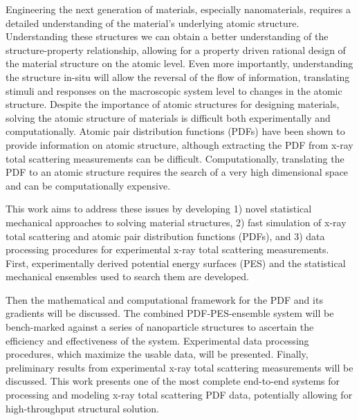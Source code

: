 Engineering the next generation of materials, especially nanomaterials, requires a detailed understanding of the material's underlying atomic structure.
 Understanding these structures we can obtain a better understanding of the structure-property relationship, allowing for a property driven rational design of the material structure on the atomic level.
 Even more importantly, understanding the structure in-situ will allow the reversal of the flow of information, translating stimuli and responses on the macroscopic system level to changes in the atomic structure.
 Despite the importance of atomic structures for designing materials, solving the atomic structure of materials is difficult both experimentally and computationally.
 Atomic pair distribution functions (PDFs) have been shown to provide information on atomic structure, although extracting the PDF from x-ray total scattering measurements can be difficult.
 Computationally, translating the PDF to an atomic structure requires the search of a very high dimensional space and can be computationally expensive.

This work aims to address these issues by developing 1) novel statistical mechanical approaches to solving material structures, 2)  fast simulation of x-ray total scattering and atomic pair distribution functions (PDFs), and 3) data processing procedures for experimental x-ray total scattering measurements.
First, experimentally derived potential energy surfaces (PES) and the statistical mechanical ensembles used to search them are developed.

Then the mathematical and computational framework for the PDF and its gradients will be discussed.
The combined PDF-PES-ensemble system will be bench-marked against a series of nanoparticle structures to ascertain the efficiency and effectiveness of the system.
Experimental data processing procedures, which maximize the usable data, will be presented.
Finally, preliminary results from experimental x-ray total scattering measurements will be discussed.
This work presents one of the most complete end-to-end systems for processing and modeling x-ray total scattering PDF data, potentially allowing for high-throughput structural solution.